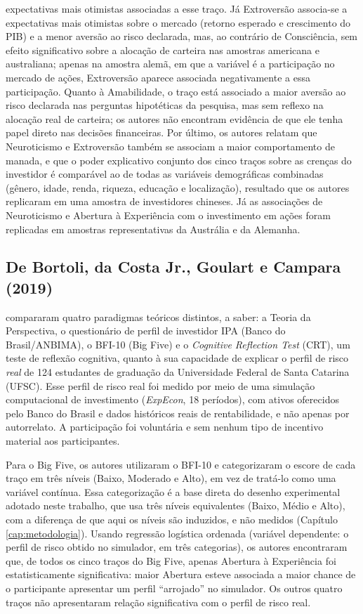 expectativas mais otimistas associadas a esse traço. Já Extroversão
associa-se a expectativas mais otimistas sobre o mercado (retorno
esperado e crescimento do PIB) e a menor aversão ao risco declarada, mas,
ao contrário de Consciência, sem efeito significativo sobre a
alocação de carteira nas amostras americana e australiana; apenas na
amostra alemã, em que a variável é a participação no mercado de ações,
Extroversão aparece associada negativamente a essa participação. Quanto
à Amabilidade, o traço está associado a maior aversão ao risco declarada
nas perguntas hipotéticas da pesquisa, mas sem reflexo na alocação real
de carteira; os autores não encontram evidência de que ele tenha papel
direto nas decisões financeiras. Por último, os autores
relatam que Neuroticismo e Extroversão também se associam a maior
comportamento de manada, e que o poder explicativo conjunto dos cinco
traços sobre as crenças do investidor é comparável ao de todas as
variáveis demográficas combinadas (gênero, idade, renda, riqueza,
educação e localização), resultado que os autores replicaram em uma
amostra de investidores chineses. Já as associações de Neuroticismo e
Abertura à Experiência com o investimento em ações foram replicadas em
amostras representativas da Austrália e da Alemanha.

\subsection{De Bortoli, da Costa Jr., Goulart e Campara (2019)}

 compararam quatro paradigmas teóricos
distintos, a saber: a Teoria da Perspectiva, o questionário de perfil de
investidor IPA (Banco do Brasil/ANBIMA), o BFI-10 (Big Five) e o
\textit{Cognitive Reflection Test} (CRT), um teste de reflexão
cognitiva, quanto à sua capacidade de explicar o perfil de risco
\textit{real} de 124 estudantes de graduação da Universidade Federal de
Santa Catarina (UFSC). Esse perfil de risco real foi medido por meio de
uma simulação computacional de investimento (\textit{ExpEcon}, 18
períodos), com ativos oferecidos pelo Banco do Brasil e dados históricos
reais de rentabilidade, e não apenas por autorrelato. A participação foi
voluntária e sem nenhum tipo de incentivo material aos participantes.

Para o Big Five, os autores utilizaram o BFI-10 e categorizaram o escore
de cada traço em três níveis (Baixo, Moderado e Alto), em vez de
tratá-lo como uma variável contínua. Essa categorização é a base direta
do desenho experimental adotado neste trabalho, que usa três níveis
equivalentes (Baixo, Médio e Alto), com a diferença de que aqui os
níveis são induzidos, e não medidos (Capítulo \ref{cap:metodologia}).
Usando regressão logística ordenada (variável dependente: o perfil de
risco obtido no simulador, em três categorias), os autores encontraram
que, de todos os cinco traços do Big Five, apenas Abertura à Experiência
foi estatisticamente significativa: maior
Abertura esteve associada a maior chance de o participante apresentar um
perfil ``arrojado'' no simulador. Os outros quatro traços não
apresentaram relação significativa com o perfil de risco real.

